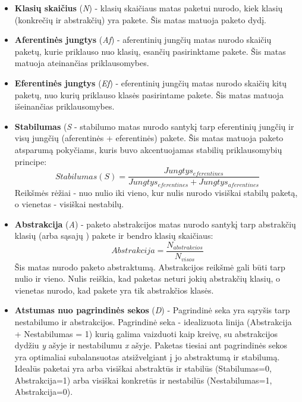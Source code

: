 \begin{itemize}
    \item \textbf{Klasių skaičius} (\textit{N}) - klasių skaičiaus matas paketui nurodo, kiek klasių (konkrečių ir abstrakčių) yra pakete.
    Šis matas matuoja paketo dydį.
    \item \textbf{Aferentinės jungtys } (\textit{Af}) - aferentinių jungčių matas nurodo
    skaičių paketų, kurie priklauso nuo klasių, esančių pasirinktame pakete.
    Šis matas matuoja ateinančias priklausomybes.
    \item \textbf{Eferentinės jungtys } (\textit{Ef}) - eferentinių jungčių matas nurodo skaičių kitų paketų,
    nuo kurių priklauso klasės pasirintame pakete.
    Šis matas matuoja išeinančias priklausomybes.
    \item \textbf{Stabilumas} (\textit{S} - stabilumo matas nurodo santykį tarp eferentinių jungčių ir
    visų jungčių (aferentinės + eferentinės) pakete.
    Šis matas matuoja paketo atsparumą pokyčiams, kuris buvo akcentuojamas stabilių priklausomybių principe:
    \begin{equation}
        Stabilumas (S) =\frac{Jungtys_{eferentines}}{Jungtys_{eferentines} + Jungtys_{aferentines}}
    \end{equation}
    Reikšmės rėžiai - nuo nulio iki vieno, kur nulis nurodo visiškai stabilų paketą, o vienetas - visiškai nestabilų.
    \item \textbf{Abstrakcija} (\textit{A}) - paketo abstrakcijos matas nurodo santykį tarp abstrakčių klasių (arba sąsajų ) pakete ir bendro klasių skaičiaus:
    \begin{equation}
        Abstrakcija=\frac{N_{abstrakcios}}{N_{visos}}
    \end{equation}
    Šis matas nurodo paketo abstraktumą.
    Abstrakcijos reikšmė gali būti tarp nulio ir vieno.
    Nulis reiškia, kad paketas neturi jokių abstrakčių klasių, o vienetas nurodo, kad pakete yra tik abstrakčios klasės.
    \item \textbf{Atstumas nuo pagrindinės sekos} (\textit{D}) -
    Pagrindinė seka yra sąryšis tarp nestabilumo ir abstrakcijos.
    Pagrindinė seka - idealizuota linija (Abstrakcija + Nestabilumas = 1)  kurią galima vaizduoti kaip kreivę, su abstrakcijos dydžiu \textit{y} ašyje ir nestabilumu \textit{x} ašyje.
    Paketas tiesiai ant pagrindinės sekos yra optimaliai subalansuotas atsižvelgiant į jo abstraktumą ir stabilumą.
    Idealūs paketai yra arba visiškai abstraktūs ir stabilūs (Stabilumas=0, Abstrakcija=1) arba visiškai konkretūs ir nestabilūs (Nestabilumas=1, Abstrakcija=0).

\end{itemize}
